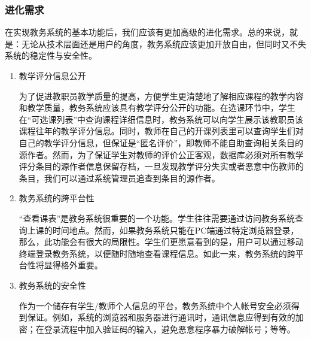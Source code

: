 \subsubsection{进化需求}
  在实现教务系统的基本功能后，我们应该有更加高级的进化需求。总的来说，就是：无论从技术层面还是用户的角度，教务系统应该更加开放自由，但同时又不失系统的稳定性与安全性。
  \begin{enumerate}
    \item 教学评分信息公开
    
    \CJKindent 为了促进教职员教学质量的提高，方便学生更清楚地了解相应课程的教学内容和教学质量，教务系统应该具有教学评分公开的功能。在选课环节中，学生在“可选课列表”中查询课程详细信息时，教务系统可以向学生展示该教职员该课程往年的教学评分信息。同时，教师在自己的开课列表里可以查询学生们对自己的教学评分信息，但保证是“匿名评价”，即教师不能自助查询相关条目的源作者。然而，为了保证学生对教师的评价公正客观，数据库必须对所有教学评分条目的源作者信息保留存档，一旦发现教学评分失实或者恶意中伤教师的条目，我们可以通过系统管理员追查到条目的源作者。
    
    \item 教务系统的跨平台性
    
    \CJKindent “查看课表”是教务系统很重要的一个功能。学生往往需要通过访问教务系统查询上课的时间地点。然而，如果教务系统只能在PC端通过特定浏览器登录，那么，此功能会有很大的局限性。学生们更愿意看到的是，用户可以通过移动终端登录教务系统，以便随时随地查看课程信息。如此一来，教务系统的跨平台性将显得格外重要。
    
    \item 教务系统的安全性
    
    \CJKindent 作为一个储存有学生/教师个人信息的平台，教务系统中个人帐号安全必须得到保证。例如，系统的浏览器和服务器进行通讯时，通讯信息应得到有效的加密；在登录流程中加入验证码的输入，避免恶意程序暴力破解帐号；等等。
  \end{enumerate}

